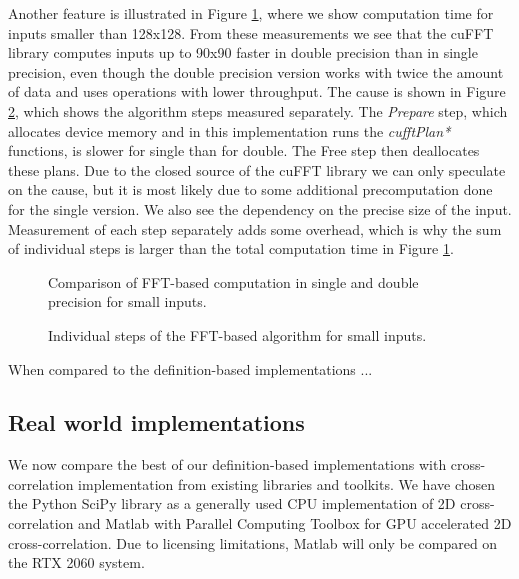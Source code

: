 Another feature is illustrated in Figure \ref{fig:fft_double_faster_compute_time}, where we show computation time for inputs smaller than 128x128. From these measurements we see that the cuFFT library computes inputs up to 90x90
faster in double precision than in single precision, even though the  double precision version works with twice the amount of data and uses operations with lower throughput. The cause is shown in Figure \ref{fig:fft_double_faster_steps}, which shows the algorithm steps measured separately. The \textit{Prepare} step, which allocates device memory and in this implementation runs the \textit{cufftPlan*} functions, is slower for single than for double. The Free step then deallocates these plans. Due to the closed source of the cuFFT library we can only speculate on the cause, but it is most likely due to some additional precomputation done for the single version. We also see the dependency on the precise size of the input. Measurement of each step separately adds some overhead, which is why the sum of individual steps is larger than the total computation time in Figure \ref{fig:fft_double_faster_compute_time}.

\begin{figure}[ht]
	\centering
	\def\svgwidth{0.5\textwidth}
	
	\caption{Comparison of FFT-based computation in single and double precision for small inputs.}
	\label{fig:fft_double_faster_compute_time}
\end{figure}

\begin{figure}[ht]
	\centering
	\def\svgwidth{\textwidth}
	
	\caption{Individual steps of the FFT-based algorithm for small inputs.}
	\label{fig:fft_double_faster_steps}
\end{figure}


When compared to the definition-based implementations ...

\subsection{Real world implementations}

We now compare the best of our definition-based implementations with cross-correlation implementation from existing libraries and toolkits. We have chosen the Python SciPy library as a generally used CPU implementation of 2D cross-correlation and Matlab with Parallel Computing Toolbox for GPU accelerated 2D cross-correlation. Due to licensing limitations, Matlab will only be compared on the RTX 2060 system.


